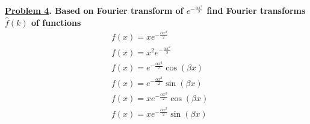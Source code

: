 \documentclass{article}
\theoremstyle{definition}
\newenvironment{boldenv}{\bfseries\boldmath}{}
\begin{document}
\begin{boldenv}
    \underline{Problem 4}. Based on Fourier transform of $e^{-\frac{\alpha x^2}{2}}$ find Fourier transforms $\hat{f}(k)$ of functions \begin{align}
        & f(x) = x e^{-\frac{\alpha x^2}{2}}\\
        & f(x) = x^2 e^{-\frac{\alpha x^2}{2}}\\
        & f(x) = e^{-\frac{\alpha x^2}{2}} \cos(\beta x)\\
        & f(x) = e^{-\frac{\alpha x^2}{2}} \sin(\beta x)\\
        & f(x) = x e^{-\frac{\alpha x^2}{2}} \cos(\beta x)\\
        & f(x) = x e^{-\frac{\alpha x^2}{2}} \sin(\beta x)
    \end{align}
\end{boldenv}
\end{document}

